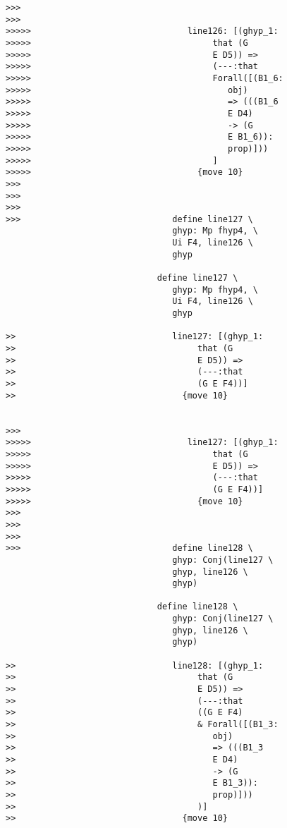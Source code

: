 \documentclass[12pt]{article}
\begin{document}
\begin{verbatim}
>>>
>>>
>>>>>                               line126: [(ghyp_1:
>>>>>                                    that (G
>>>>>                                    E D5)) =>
>>>>>                                    (---:that
>>>>>                                    Forall([(B1_6:
>>>>>                                       obj)
>>>>>                                       => (((B1_6
>>>>>                                       E D4)
>>>>>                                       -> (G
>>>>>                                       E B1_6)):
>>>>>                                       prop)]))
>>>>>                                    ]
>>>>>                                 {move 10}
>>>
>>>
>>>
>>>                              define line127 \
                                 ghyp: Mp fhyp4, \
                                 Ui F4, line126 \
                                 ghyp

                              define line127 \
                                 ghyp: Mp fhyp4, \
                                 Ui F4, line126 \
                                 ghyp

>>                               line127: [(ghyp_1:
>>                                    that (G
>>                                    E D5)) =>
>>                                    (---:that
>>                                    (G E F4))]
>>                                 {move 10}


>>>
>>>>>                               line127: [(ghyp_1:
>>>>>                                    that (G
>>>>>                                    E D5)) =>
>>>>>                                    (---:that
>>>>>                                    (G E F4))]
>>>>>                                 {move 10}
>>>
>>>
>>>
>>>                              define line128 \
                                 ghyp: Conj(line127 \
                                 ghyp, line126 \
                                 ghyp)

                              define line128 \
                                 ghyp: Conj(line127 \
                                 ghyp, line126 \
                                 ghyp)

>>                               line128: [(ghyp_1:
>>                                    that (G
>>                                    E D5)) =>
>>                                    (---:that
>>                                    ((G E F4)
>>                                    & Forall([(B1_3:
>>                                       obj)
>>                                       => (((B1_3
>>                                       E D4)
>>                                       -> (G
>>                                       E B1_3)):
>>                                       prop)]))
>>                                    )]
>>                                 {move 10}



\end{verbatim}
\end{document}
